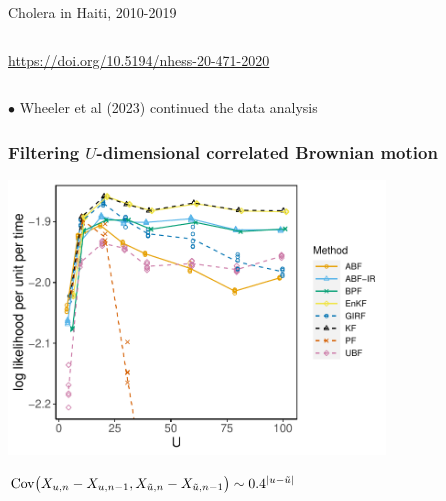 \documentclass{beamer}
\begin{document}
\begin{frame}{Cholera in Haiti, 2010-2019}
\begin{columns}[T]
\begin{column}{.62\textwidth}
  \vspace{-3mm}
  
  \begin{center}
    {  \tiny \url{https://doi.org/10.5194/nhess-20-471-2020}}
  \end{center}
  

\end{column}

\end{columns}

  \vspace{4mm}
  
   $\bullet$ Wheeler et al (2023) continued the data analysis

\end{frame}


\begin{frame}
\frametitle{Filtering $U$-dimensional correlated Brownian motion}

\vspace{-3mm}

\begin{center}
\includegraphics[width=10cm]{bm_alt_plot-1.pdf}

\vspace{-1mm}

$\mathrm{Cov}\big(X_{u,n}-X_{u,n-1},X_{\tilde u,n}-X_{\tilde u,n-1}\big) \sim 0.4^{|u-\tilde u|}_{}$

\end{center}

\end{frame}
\end{document}
